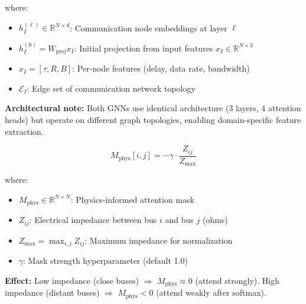 \noindent where:
\begin{itemize}
    \item $h_I^{(\ell)} \in \mathbb{R}^{N \times d}$: Communication node embeddings at layer $\ell$
    \item $h_I^{(0)} = W_{\text{proj}} x_I$: Initial projection from input features $x_I \in \mathbb{R}^{N \times 3}$
    \item $x_I = [\tau, R, B]$: Per-node features (delay, data rate, bandwidth)
    \item $\mathcal{E}_I$: Edge set of communication network topology
\end{itemize}

\textbf{Architectural note:} Both GNNs use identical architecture (3 layers, 4 attention heads) but operate on different graph topologies, enabling domain-specific feature extraction.




\begin{equation}
\label{eq:physics_mask}
M_{\text{phys}}[i,j] = -\gamma \cdot \frac{Z_{ij}}{Z_{\max}}
\end{equation}

\noindent where:
\begin{itemize}
    \item $M_{\text{phys}} \in \mathbb{R}^{N \times N}$: Physics-informed attention mask
    \item $Z_{ij}$: Electrical impedance between bus $i$ and bus $j$ (ohms)
    \item $Z_{\max} = \max_{i,j} Z_{ij}$: Maximum impedance for normalization
    \item $\gamma$: Mask strength hyperparameter (default 1.0)
\end{itemize}

\textbf{Effect:} Low impedance (close buses) $\Rightarrow$ $M_{\text{phys}} \approx 0$ (attend strongly). High impedance (distant buses) $\Rightarrow$ $M_{\text{phys}} < 0$ (attend weakly after softmax).

